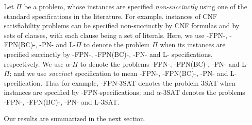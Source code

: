 \noindent
Let $\Pi$ be a problem, whose instances are specified {\em non-succinctly} 
using one of the standard specifications in the literature. For example,
instances of {\sf CNF} satisfiability problems can be specified non-succinctly
by {\sf CNF} formulas and by sets of clauses, with each clause being a set of 
literals.
Here, we use {-FPN-}, {-FPN(BC)-}, {-PN-} and {\sf L-}$\Pi$ to
denote the problem $\Pi$ 
when its instances are specified succinctly by {-FPN-}, 
{-FPN(BC)-}, {-PN-} and {\sf L-} specifications, respectively. 
We use $\alpha$-$\Pi$ to denote the problems {-FPN-}, {-FPN(BC)-},
 {-PN-} and {\sf L-}$\Pi$; and we use {\em succinct} specification 
to mean {-FPN-}, {-FPN(BC)-}, {-PN-} and {\sf L-}specification. 
Thus for example, {-FPN-3SAT} denotes the problem {\sf 3SAT}
when instances are specified  by {-FPN-}specifications; and 
$\alpha$-{\sf 3SAT} denotes the problems {-FPN-}, {-FPN(BC)-}, 
{-PN-} and {\sf L-3SAT}.

\smallskip

Our results are summarized in the next section.
